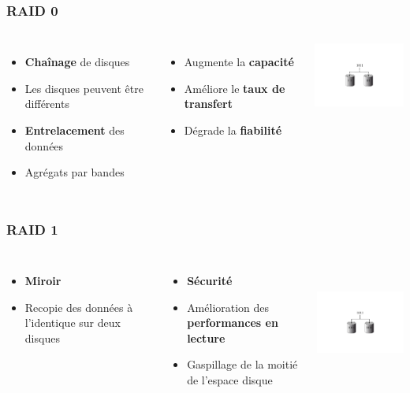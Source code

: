 \begin{frame}
\frametitle{RAID 0}
\begin{columns}
\begin{itemize}
\item \textbf{Chaînage} de disques
\item Les disques peuvent être différents
\item \textbf{Entrelacement} des données
\item Agrégats par bandes
\end{itemize}
\begin{itemize}
\item Augmente la \textbf{capacité}
\item Améliore le \textbf{taux de transfert}
\item Dégrade la \textbf{fiabilité}
\end{itemize}
\includegraphics[width=4cm]{../illustration/RAID0.pdf}
\end{columns}
\end{frame}


\begin{frame}
\frametitle{RAID 1}
\begin{columns}
\begin{itemize}
\item \textbf{Miroir}
\item Recopie des données à l'identique sur deux disques
\end{itemize}
\begin{itemize}
\item \textbf{Sécurité}
\item Amélioration des \textbf{performances en lecture}
\item Gaspillage de la moitié de l’espace disque
\end{itemize}
\includegraphics[height=4cm]{../illustration/RAID1.pdf}
\end{columns}
\end{frame}

